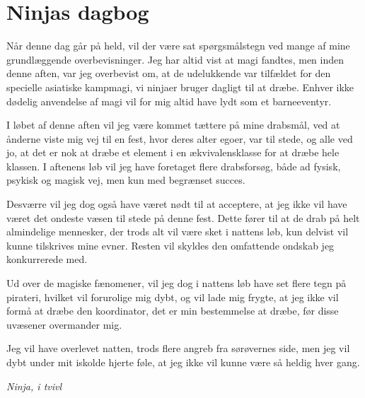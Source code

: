 \begin{minipage}[t]{100mm}
\vspace{3mm}
\section*{Ninjas dagbog}
Når denne dag går på held, vil der være sat spørgsmålstegn ved mange af mine grundlæggende overbevisninger. Jeg har altid vist at magi fandtes, men inden denne aften, var jeg overbevist om, at de udelukkende var tilfældet for den specielle asiatiske kampmagi, vi ninjaer bruger dagligt til at dræbe. Enhver ikke dødelig anvendelse af magi vil for mig altid have lydt som et barneeventyr.

I løbet af denne aften vil jeg være kommet tættere på mine drabsmål, ved at ånderne viste mig vej til en fest, hvor deres alter egoer, var til stede, og alle ved jo, at det er nok at dræbe et element i en ækvivalensklasse for at dræbe hele klassen. I aftenens løb vil jeg have foretaget flere drabsforsøg, både ad fysisk, psykisk og magisk vej, men kun med begrænset succes.

Desværre vil jeg dog også have været nødt til at acceptere, at jeg ikke vil have været det ondeste væsen til stede på denne fest. Dette fører til at de drab på helt almindelige mennesker, der trods alt vil være sket i nattens løb, kun delvist vil kunne tilskrives mine evner. Resten vil skyldes den omfattende ondskab jeg konkurrerede med.

Ud over de magiske fænomener, vil jeg dog i nattens løb have set flere tegn på pirateri, hvilket vil forurolige mig dybt, og vil lade mig frygte, at jeg ikke vil formå at dræbe den koordinator, det er min bestemmelse at dræbe, før disse uvæsener overmander mig.

Jeg vil have overlevet natten, trods flere angreb fra sørøvernes side, men jeg vil dybt under mit iskolde hjerte føle, at jeg ikke vil kunne være så heldig hver gang.

\emph{Ninja, i tvivl}


\end{minipage}
